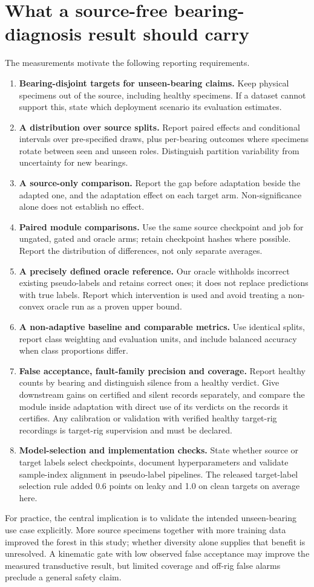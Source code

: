\section{What a source-free bearing-diagnosis result should carry}
\label{sec:recommendations}
The measurements motivate the following reporting requirements.
\begin{enumerate}
\item \textbf{Bearing-disjoint targets for unseen-bearing claims.} Keep physical specimens out of the source, including healthy specimens. If a dataset cannot support this, state which deployment scenario its evaluation estimates.
\item \textbf{A distribution over source splits.} Report paired effects and conditional intervals over pre-specified draws, plus per-bearing outcomes where specimens rotate between seen and unseen roles. Distinguish partition variability from uncertainty for new bearings.
\item \textbf{A source-only comparison.} Report the gap before adaptation beside the adapted one, and the adaptation effect on each target arm. Non-significance alone does not establish no effect.
\item \textbf{Paired module comparisons.} Use the same source checkpoint and job for ungated, gated and oracle arms; retain checkpoint hashes where possible. Report the distribution of differences, not only separate averages.
\item \textbf{A precisely defined oracle reference.} Our oracle withholds incorrect existing pseudo-labels and retains correct ones; it does not replace predictions with true labels. Report which intervention is used and avoid treating a non-convex oracle run as a proven upper bound.
\item \textbf{A non-adaptive baseline and comparable metrics.} Use identical splits, report class weighting and evaluation units, and include balanced accuracy when class proportions differ.
\item \textbf{False acceptance, fault-family precision and coverage.} Report healthy counts by bearing and distinguish silence from a healthy verdict. Give downstream gains on certified and silent records separately, and compare the module inside adaptation with direct use of its verdicts on the records it certifies. Any calibration or validation with verified healthy target-rig recordings is target-rig supervision and must be declared.
\item \textbf{Model-selection and implementation checks.} State whether source or target labels select checkpoints, document hyperparameters and validate sample-index alignment in pseudo-label pipelines. The released target-label selection rule added 0.6 points on leaky and 1.0 on clean targets on average here.
\end{enumerate}
For practice, the central implication is to validate the intended unseen-bearing use case explicitly. More source specimens together with more training data improved the forest in this study; whether diversity alone supplies that benefit is unresolved. A kinematic gate with low observed false acceptance may improve the measured transductive result, but limited coverage and off-rig false alarms preclude a general safety claim.
